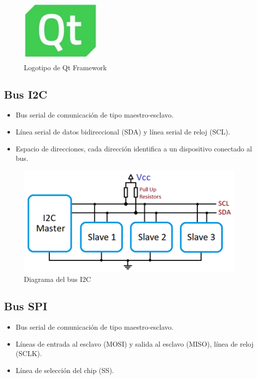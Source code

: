 \documentclass[12pt]{report}
\begin{document}
\begin{figure}[htb]
	\centering
	\includegraphics[scale=0.5]{qt.jpg}
	\caption{Logotipo de Qt Framework}
\end{figure}

\subsection*{Bus I2C}
\begin{itemize}
	
	\item Bus serial de comunicación de tipo maestro-esclavo.
	
	\item Línea serial de datos bidireccional (SDA)  y línea serial de reloj (SCL).
	
	\item Espacio de direcciones, cada dirección identifica a un dispositivo conectado al bus.
	
\end{itemize}

\begin{figure}[htb]
	\centering
	\includegraphics[scale=0.5]{i2c.png}
	\caption{Diagrama del bus I2C}
\end{figure}

\subsection*{Bus SPI}
\begin{itemize}
	
	\item Bus serial de comunicación de tipo maestro-esclavo.
	
	\item Líneas de entrada al esclavo (MOSI) y salida al esclavo (MISO), línea de reloj (SCLK).
	
	\item Línea de selección del chip (SS).
	
\end{itemize}
\end{document}
